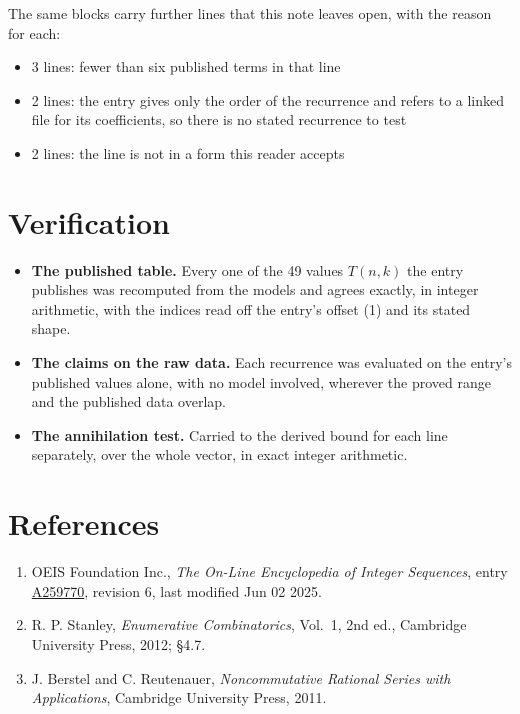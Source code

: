 \documentclass[11pt]{article}
\theoremstyle{definition}
\begin{document}
The same blocks carry further lines that this note leaves open, with the reason for each:

\begin{itemize}

\item 3 lines: fewer than six published terms in that line

\item 2 lines: the entry gives only the order of the recurrence and refers to a linked file for its coefficients, so there is no stated recurrence to test

\item 2 lines: the line is not in a form this reader accepts

\end{itemize}

\section{Verification}

\begin{itemize}

\item {\bfseries The published table.} Every one of the 49 values $T(n,k)$ the entry publishes was recomputed from the models and agrees exactly, in integer arithmetic, with the indices read off the entry's offset (1) and its stated shape.

\item {\bfseries The claims on the raw data.} Each recurrence was evaluated on the entry's published values alone, with no model involved, wherever the proved range and the published data overlap.

\item {\bfseries The annihilation test.} Carried to the derived bound for each line separately, over the whole vector, in exact integer arithmetic.

\end{itemize}

\section{References}

\begin{enumerate}

\item OEIS Foundation Inc., \emph{The On-Line Encyclopedia of Integer Sequences}, entry \href{https://oeis.org/A259770}{A259770}, revision 6, last modified Jun 02 2025.

\item R. P. Stanley, \emph{Enumerative Combinatorics}, Vol.~1, 2nd ed., Cambridge University Press, 2012; \S4.7.

\item J. Berstel and C. Reutenauer, \emph{Noncommutative Rational Series with Applications}, Cambridge University Press, 2011.

\end{enumerate}
\end{document}

